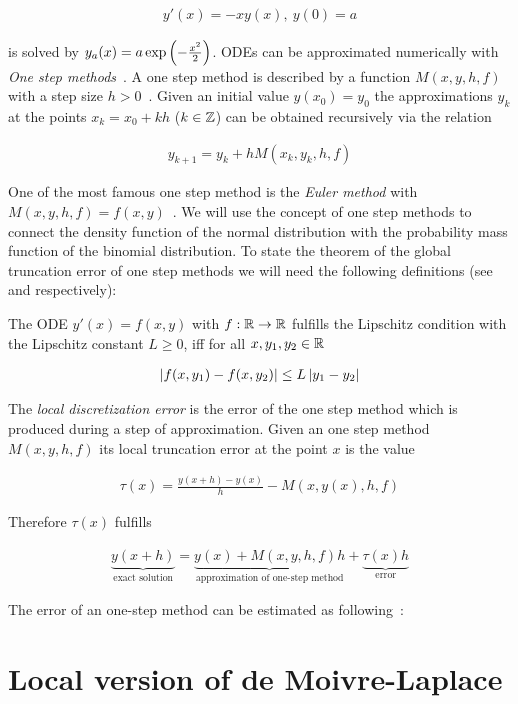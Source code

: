 \begin{align}
  y'(x) = -xy(x),\ y(0)=a
\end{align}

is solved by $y_a(x) = a \exp\left( {-\frac{x^2}2} \right)$. ODEs can be approximated numerically with \emph{One step methods}~\cite[pp.~471~ff]{stoer}. A one step method is described by a function $M(x,y,h,f)$ with a step size $h>0$~\cite[p.~473]{stoer}. Given an initial value $y(x_0)=y_0$ the approximations $y_k$ at the points $x_k = x_0 + kh$ ($k\in\mathbb Z$) can be obtained recursively via the relation~\cite[p. 473]{stoer}

\begin{align}
  y_{k+1} = y_k + h M(x_k, y_k, h, f)
\end{align}

One of the most famous one step method is the \emph{Euler method} with $M(x,y,h,f) = f(x,y)$~\cite[p. 473]{stoer}. We will use the concept of one step methods to connect the density function of the normal distribution with the probability mass function of the binomial distribution. To state the theorem of the global truncation error of one step methods we will need the following definitions (see \cite[p. 467]{stoer}\cite{wiki:lipschitz} and \cite[pp. 473-474]{stoer} respectively):

\begin{definition}
  The ODE $y'(x) = f(x,y)$ with $f:\mathbb R\to\mathbb R$ fulfills the Lipschitz condition with the Lipschitz constant $L\ge 0$, iff for all $x,y_1,y_2\in\mathbb R$

  \begin{align}
    \left|{f(x,y_1)-f(x,y_2)}\right| \le L\left|{y_1-y_2}\right|
  \end{align}
\end{definition}

\begin{definition}
  The \emph{local discretization error} is the error of the one step method which is produced during a step of approximation. Given an one step method $M(x,y,h,f)$ its local truncation error at the point $x$ is the value

  \begin{align}
    \tau(x) = \frac{y(x+h)-y(x)}h - M(x,y(x),h,f)
  \end{align}
\end{definition}

\noindent Therefore $\tau(x)$ fulfills

\begin{align}
  \underbrace{y(x+h)}_{\text{exact solution}} = \underbrace{y(x) + M(x,y,h,f)h}_{\text{approximation of one-step method}} + \underbrace{\tau(x)h}_{\text{error}}
\end{align}

\noindent The error of an one-step method can be estimated as following~\cite[pp. 478-479]{stoer}:

\begin{theorem}
  
\end{theorem}

\section{Local version of de Moivre-Laplace}


